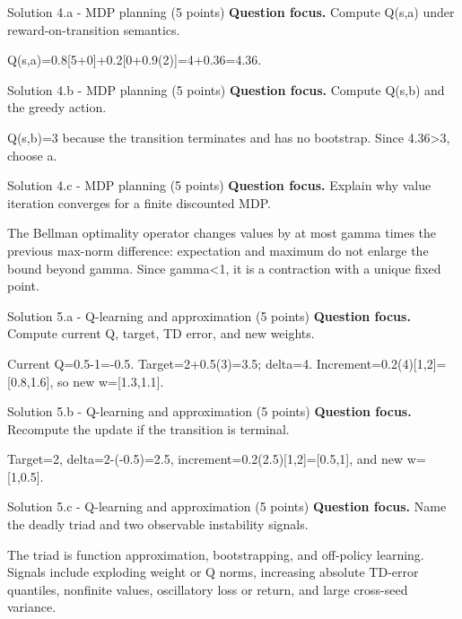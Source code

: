 \documentclass[aspectratio=169,11pt]{beamer}
\begin{document}
\begin{frame}{Solution 4.a - MDP planning (5 points)}
\small
\textbf{Question focus.} Compute Q(s,a) under reward-on-transition semantics.

\vspace{0.25cm}
\answerlabel Q(s,a)=0.8[5+0]+0.2[0+0.9(2)]=4+0.36=4.36.
\end{frame}

\begin{frame}{Solution 4.b - MDP planning (5 points)}
\small
\textbf{Question focus.} Compute Q(s,b) and the greedy action.

\vspace{0.25cm}
\answerlabel Q(s,b)=3 because the transition terminates and has no bootstrap. Since 4.36>3, choose a.
\end{frame}

\begin{frame}{Solution 4.c - MDP planning (5 points)}
\small
\textbf{Question focus.} Explain why value iteration converges for a finite discounted MDP.

\vspace{0.25cm}
\answerlabel The Bellman optimality operator changes values by at most gamma times the previous max-norm difference: expectation and maximum do not enlarge the bound beyond gamma. Since gamma<1, it is a contraction with a unique fixed point.
\end{frame}

\begin{frame}{Solution 5.a - Q-learning and approximation (5 points)}
\small
\textbf{Question focus.} Compute current Q, target, TD error, and new weights.

\vspace{0.25cm}
\answerlabel Current Q=0.5-1=-0.5. Target=2+0.5(3)=3.5; delta=4. Increment=0.2(4)[1,2]=[0.8,1.6], so new w=[1.3,1.1].
\end{frame}

\begin{frame}{Solution 5.b - Q-learning and approximation (5 points)}
\small
\textbf{Question focus.} Recompute the update if the transition is terminal.

\vspace{0.25cm}
\answerlabel Target=2, delta=2-(-0.5)=2.5, increment=0.2(2.5)[1,2]=[0.5,1], and new w=[1,0.5].
\end{frame}

\begin{frame}{Solution 5.c - Q-learning and approximation (5 points)}
\small
\textbf{Question focus.} Name the deadly triad and two observable instability signals.

\vspace{0.25cm}
\answerlabel The triad is function approximation, bootstrapping, and off-policy learning. Signals include exploding weight or Q norms, increasing absolute TD-error quantiles, nonfinite values, oscillatory loss or return, and large cross-seed variance.
\end{frame}
\end{document}
